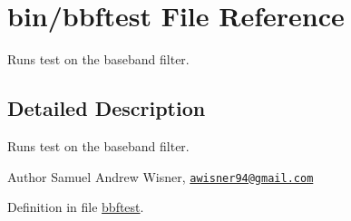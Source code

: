 \hypertarget{bbftest}{\section{bin/bbftest File Reference}
\label{bbftest}
}


Runs test on the baseband filter.  




\subsection{Detailed Description}
Runs test on the baseband filter. 

\begin{DoxyAuthor}{Author}
Samuel Andrew Wisner, \href{mailto:awisner94@gmail.com}{\tt awisner94@gmail.\+com} 
\end{DoxyAuthor}


Definition in file \hyperlink{bbftest_source}{bbftest}.

